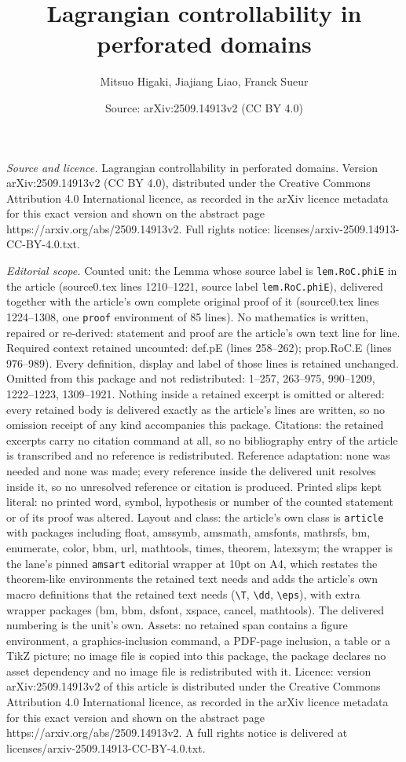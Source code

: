 \documentclass[10pt,a4paper]{amsart}
\title[Lagrangian controllability in perforated domains]{Lagrangian controllability in perforated domains}
\author{Mitsuo Higaki, Jiajiang Liao, Franck Sueur}
\date{Source: arXiv:2509.14913v2 (CC BY 4.0)}
\begin{document}
\maketitle

\noindent\emph{Source and licence.} Lagrangian controllability in perforated domains. Version arXiv:2509.14913v2 (CC BY 4.0), distributed under the Creative Commons Attribution 4.0 International licence, as recorded in the arXiv licence metadata for this exact version and shown on the abstract page https://arxiv.org/abs/2509.14913v2. Full rights notice: licenses/arxiv-2509.14913-CC-BY-4.0.txt.\par\smallskip

\noindent\textit{Editorial scope.} Counted unit: the Lemma whose source label is \texttt{lem.RoC.phiE} in the article (source0.tex lines 1210--1221, source label \texttt{lem.RoC.phiE}), delivered together with the article's own complete original proof of it (source0.tex lines 1224--1308, one \texttt{proof} environment of 85 lines). No mathematics is written, repaired or re-derived: statement and proof are the article's own text line for line. Required context retained uncounted: def.pE (lines 258--262); prop.RoC.E (lines 976--989). Every definition, display and label of those lines is retained unchanged. Omitted from this package and not redistributed: 1--257, 263--975, 990--1209, 1222--1223, 1309--1921. Nothing inside a retained excerpt is omitted or altered: every retained body is delivered exactly as the article's lines are written, so no omission receipt of any kind accompanies this package. Citations: the retained excerpts carry no citation command at all, so no bibliography entry of the article is transcribed and no reference is redistributed. Reference adaptation: none was needed and none was made; every reference inside the delivered unit resolves inside it, so no unresolved reference or citation is produced. Printed slips kept literal: no printed word, symbol, hypothesis or number of the counted statement or of its proof was altered. Layout and class: the article's own class is \texttt{article} with packages including float, amssymb, amsmath, amsfonts, mathrsfs, bm, enumerate, color, bbm, url, mathtools, times, theorem, latexsym; the wrapper is the lane's pinned \texttt{amsart} editorial wrapper at 10pt on A4, which restates the theorem-like environments the retained text needs and adds the article's own macro definitions that the retained text needs (\texttt{\textbackslash T}, \texttt{\textbackslash dd}, \texttt{\textbackslash eps}), with extra wrapper packages (bm, bbm, dsfont, xspace, cancel, mathtools). The delivered numbering is the unit's own. Assets: no retained span contains a figure environment, a graphics-inclusion command, a PDF-page inclusion, a table or a TikZ picture; no image file is copied into this package, the package declares no asset dependency and no image file is redistributed with it. Licence: version arXiv:2509.14913v2 of this article is distributed under the Creative Commons Attribution 4.0 International licence, as recorded in the arXiv licence metadata for this exact version and shown on the abstract page https://arxiv.org/abs/2509.14913v2. A full rights notice is delivered at licenses/arxiv-2509.14913-CC-BY-4.0.txt. 
\end{document}
